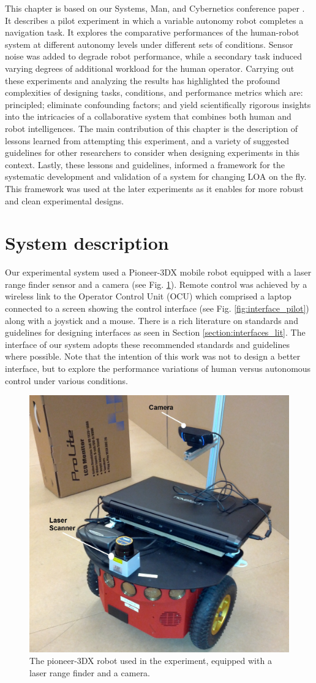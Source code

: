 \documentclass[a4paper,12pt,oneside,openright]{bhamthesis}
\begin{document}
This chapter is based on our Systems, Man, and Cybernetics conference paper \cite{Chiou2015}. It describes a pilot experiment in which a variable autonomy robot completes a navigation task. It explores the comparative performances of the human-robot system at different autonomy levels under different sets of conditions. Sensor noise was added to degrade robot performance, while a secondary task induced varying degrees of additional workload for the human operator. Carrying out these experiments and analyzing the results has highlighted the profound complexities of designing tasks, conditions, and performance metrics which are: principled; eliminate confounding factors; and yield scientifically rigorous insights into the intricacies of a collaborative system that combines both human and robot intelligences. The main contribution of this chapter is the description of lessons learned from attempting this experiment, and a variety of suggested guidelines for other researchers to consider when designing experiments in this context. Lastly, these lessons and guidelines, informed a framework for the systematic development and validation of a system for changing LOA on the fly. This framework was used at the later experiments as it enables for more robust and clean experimental designs.

\section{System description}\label{chapter3:system}
Our experimental system used a Pioneer-3DX mobile robot equipped with a laser range finder sensor and a camera (see Fig. \ref{fig:pioneer_exp1}). Remote control was achieved by a wireless link to the Operator Control Unit (OCU) which comprised a laptop connected to a screen showing the control interface (see Fig. \ref{fig:interface_pilot}) along with a joystick and a mouse. There is a rich literature on standards and guidelines for designing interfaces as seen in Section \ref{section:interfaces_lit}. The interface of our system adopts these recommended standards and guidelines where possible. Note that the intention of this work was not to design a better interface, but to explore the performance variations of human versus autonomous control under various conditions. 

\begin{figure}
	\centering
	\includegraphics[width=0.5\columnwidth]{chapter5_fig/pioneer.jpg}
	\caption{The pioneer-3DX robot used in the experiment, equipped with a laser range finder and a camera.}
	\label{fig:pioneer_exp1}
\end{figure}
\end{document}
